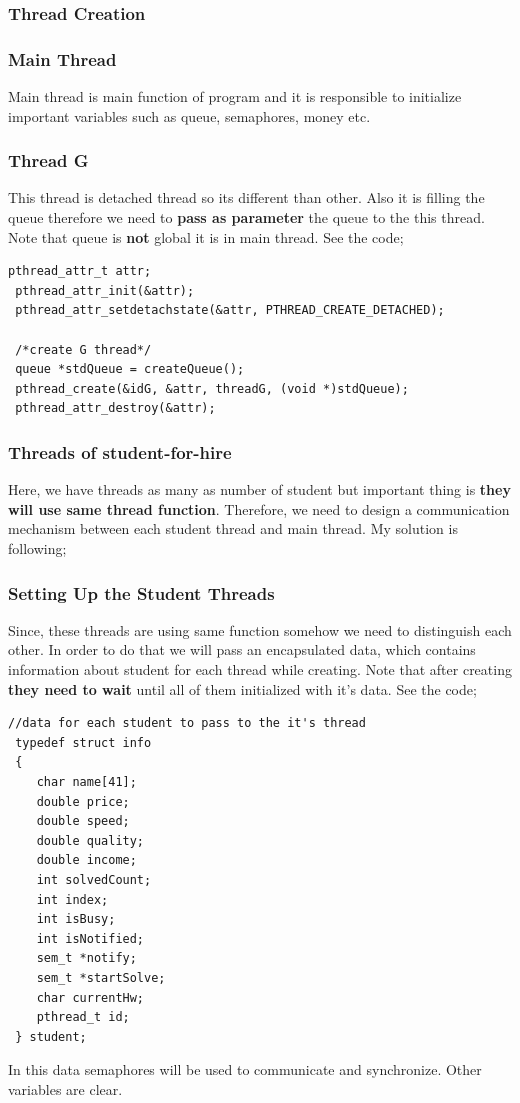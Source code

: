\documentclass{article}
\begin{document}
\subsubsection{Thread Creation}
\subsubsection*{Main Thread}
Main thread is main function of program and it is responsible to initialize important variables such as queue, semaphores, money etc.
\subsubsection*{Thread G}
This thread is detached thread so its different than other. Also it is filling the queue therefore we need to \textbf{pass as parameter} the queue
to the this thread. Note that queue is \textbf{not} global it is in main thread. See the code;
\begin{lstlisting}[style=CStyle]
 pthread_attr_t attr;
 pthread_attr_init(&attr);
 pthread_attr_setdetachstate(&attr, PTHREAD_CREATE_DETACHED);

 /*create G thread*/
 queue *stdQueue = createQueue();
 pthread_create(&idG, &attr, threadG, (void *)stdQueue);
 pthread_attr_destroy(&attr);
\end{lstlisting}
\subsubsection*{Threads of student-for-hire}
Here, we have threads as many as number of student but important thing is \textbf{they will use same thread function}. Therefore, 
we need to design a communication mechanism between each student thread and main thread. My solution is following;
\subsubsection*{Setting Up the Student Threads}
Since, these threads are using same function somehow we need to distinguish each other. In order to do that we will pass an encapsulated data,
which contains information about student for each thread while creating. Note that after creating \textbf{they need to wait} until all of them
initialized with it's data. See the code;
\cleardoublepage
\begin{lstlisting}[style=CStyle]
 //data for each student to pass to the it's thread
 typedef struct info
 {
    char name[41];
    double price;
    double speed;
    double quality;
    double income;
    int solvedCount;
    int index;
    int isBusy;
    int isNotified;
    sem_t *notify;
    sem_t *startSolve;
    char currentHw;
    pthread_t id;
 } student;
\end{lstlisting}
In this data semaphores will be used to communicate and synchronize. Other variables are clear.
\end{document}
